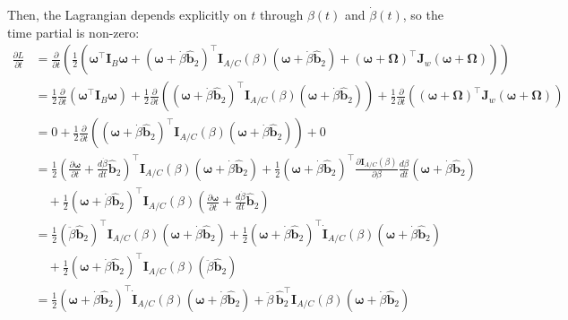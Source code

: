 \documentclass[titlepage]{article}
\begin{document}
Then, the Lagrangian depends explicitly on $t$ through $\beta(t)$ and $\dot{\beta}(t)$, so the time partial is non-zero:
\begin{equation}
	\begin{split}
		\frac{\partial L}{\partial t}&=\frac{\partial}{\partial t}\left(\frac{1}{2}\left(\boldsymbol{\omega}^\top\boldsymbol{I}_B\boldsymbol{\omega}+\left(\boldsymbol{\omega}+\dot{\beta}\hat{\boldsymbol{b}}_2\right)^\top\boldsymbol{I}_{A/C}(\beta)\left(\boldsymbol{\omega}+\dot{\beta}\hat{\boldsymbol{b}}_2\right)+\left(\boldsymbol{\omega}+\boldsymbol{\Omega}\right)^\top\boldsymbol{J}_w\left(\boldsymbol{\omega}+\boldsymbol{\Omega}\right)\right)\right) \\
		&=\frac{1}{2}\frac{\partial}{\partial t}\left(\boldsymbol{\omega}^\top\boldsymbol{I}_B\boldsymbol{\omega}\right)+\frac{1}{2}\frac{\partial}{\partial t}\left(\left(\boldsymbol{\omega}+\dot{\beta}\hat{\boldsymbol{b}}_2\right)^\top\boldsymbol{I}_{A/C}(\beta)\left(\boldsymbol{\omega}+\dot{\beta}\hat{\boldsymbol{b}}_2\right)\right)+\frac{1}{2}\frac{\partial}{\partial t}\left(\left(\boldsymbol{\omega}+\boldsymbol{\Omega}\right)^\top\boldsymbol{J}_w\left(\boldsymbol{\omega}+\boldsymbol{\Omega}\right)\right) \\
		&=0+\frac{1}{2}\frac{\partial}{\partial t}\left(\left(\boldsymbol{\omega}+\dot{\beta}\hat{\boldsymbol{b}}_2\right)^\top\boldsymbol{I}_{A/C}(\beta)\left(\boldsymbol{\omega}+\dot{\beta}\hat{\boldsymbol{b}}_2\right)\right)+0 \\
		&=\frac{1}{2}\left(\frac{\partial\boldsymbol{\omega}}{\partial t}+\frac{d\dot{\beta}}{dt}\hat{\boldsymbol{b}}_2\right)^\top\boldsymbol{I}_{A/C}(\beta)\left(\boldsymbol{\omega}+\dot{\beta}\hat{\boldsymbol{b}}_2\right)+\frac{1}{2}\left(\boldsymbol{\omega}+\dot{\beta}\hat{\boldsymbol{b}}_2\right)^\top\frac{\partial\boldsymbol{I}_{A/C}(\beta)}{\partial\beta}\frac{d\beta}{dt}\left(\boldsymbol{\omega}+\dot{\beta}\hat{\boldsymbol{b}}_2\right) \\
		&\quad+\frac{1}{2}\left(\boldsymbol{\omega}+\dot{\beta}\hat{\boldsymbol{b}}_2\right)^\top\boldsymbol{I}_{A/C}(\beta)\left(\frac{\partial\boldsymbol{\omega}}{\partial t}+\frac{d\dot{\beta}}{dt}\hat{\boldsymbol{b}}_2\right) \\
		&=\frac{1}{2}\left(\ddot{\beta}\hat{\boldsymbol{b}}_2\right)^\top\boldsymbol{I}_{A/C}(\beta)\left(\boldsymbol{\omega}+\dot{\beta}\hat{\boldsymbol{b}}_2\right)+\frac{1}{2}\left(\boldsymbol{\omega}+\dot{\beta}\hat{\boldsymbol{b}}_2\right)^\top\dot{\boldsymbol{I}}_{A/C}(\beta)\left(\boldsymbol{\omega}+\dot{\beta}\hat{\boldsymbol{b}}_2\right) \\
		&\quad+\frac{1}{2}\left(\boldsymbol{\omega}+\dot{\beta}\hat{\boldsymbol{b}}_2\right)^\top\boldsymbol{I}_{A/C}(\beta)\left(\ddot{\beta}\hat{\boldsymbol{b}}_2\right) \\
		&=\frac{1}{2}\left(\boldsymbol{\omega}+\dot{\beta}\hat{\boldsymbol{b}}_2\right)^\top\dot{\boldsymbol{I}}_{A/C}(\beta)\left(\boldsymbol{\omega}+\dot{\beta}\hat{\boldsymbol{b}}_2\right)+\ddot{\beta}\,\hat{\boldsymbol{b}}_2^\top\boldsymbol{I}_{A/C}(\beta)\left(\boldsymbol{\omega}+\dot{\beta}\hat{\boldsymbol{b}}_2\right)
	\end{split}
\end{equation}
\end{document}
